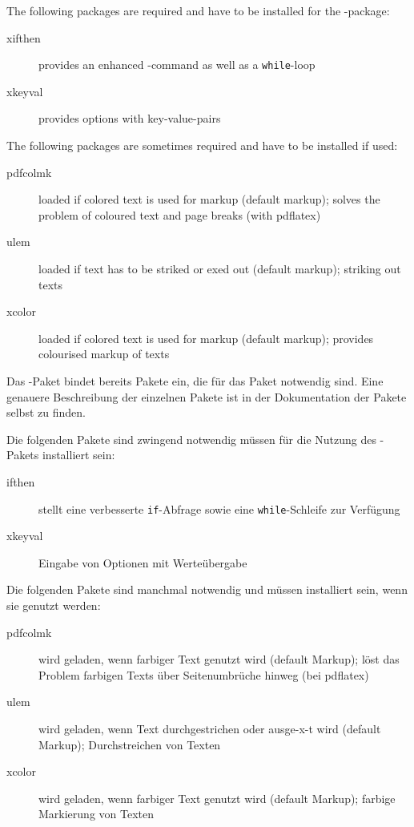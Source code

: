	The following packages are required and have to be installed for the -package:
	\begin{description}
		\item [xifthen] provides an enhanced -command as well as a \texttt{while}-loop
		\item [xkeyval] provides options with key-value-pairs
	\end{description}

	The following packages are sometimes required and have to be installed if used:
	\begin{description}
		\item [pdfcolmk] loaded if colored text is used for markup (default markup); solves the problem of coloured text and page breaks (with pdflatex)
		\item [ulem] loaded if text has to be striked or exed out (default markup); striking out texts
		\item [xcolor] loaded if colored text is used for markup (default markup); provides colourised markup of texts
	\end{description}
\fi
	\ifGERMAN
		Das -Paket bindet bereits Pakete ein, die für das Paket notwendig sind.
		Eine genauere Beschreibung der einzelnen Pakete ist in der Dokumentation der Pakete selbst zu finden.

		Die folgenden Pakete sind zwingend notwendig müssen für die Nutzung des -Pakets installiert sein:
		\begin{description}
			\item [ifthen] stellt eine verbesserte \texttt{if}-Abfrage sowie eine \texttt{while}-Schleife zur Verfügung
			\item [xkeyval] Eingabe von Optionen mit Werteübergabe
		\end{description}

		Die folgenden Pakete sind manchmal notwendig und müssen installiert sein, wenn sie genutzt werden:
		\begin{description}
			\item [pdfcolmk] wird geladen, wenn farbiger Text genutzt wird (default Markup); löst das Problem farbigen Texts über Seitenumbrüche hinweg (bei pdflatex)
			\item [ulem] wird geladen, wenn Text durchgestrichen oder ausge-x-t wird (default Markup); Durchstreichen von Texten
			\item [xcolor] wird geladen, wenn farbiger Text genutzt wird (default Markup); farbige Markierung von Texten
		\end{description}
	\fi


